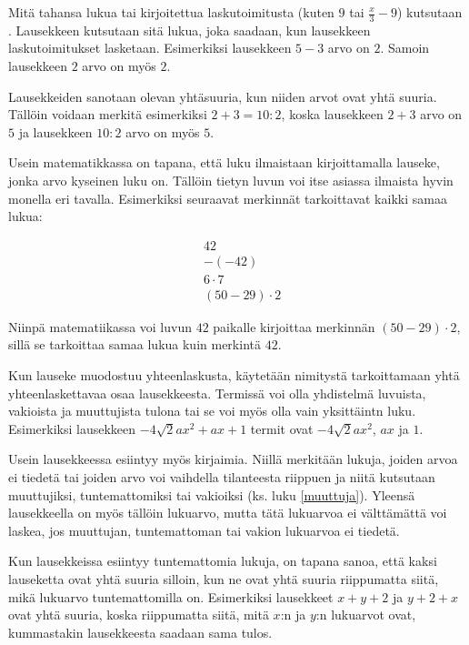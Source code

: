 Mitä tahansa lukua tai kirjoitettua laskutoimitusta (kuten $9$ tai $\frac{x}{3}-9$) kutsutaan . Lausekkeen  kutsutaan sitä lukua, joka saadaan, kun lausekkeen laskutoimitukset lasketaan. Esimerkiksi lausekkeen $5-3$ arvo on $2$. Samoin lausekkeen $2$ arvo on myös $2$.

Lausekkeiden sanotaan olevan yhtäsuuria, kun niiden arvot ovat yhtä suuria. Tällöin voidaan merkitä esimerkiksi $2+3=10:2$, koska lausekkeen $2+3$ arvo on $5$ ja lausekkeen $10:2$ arvo on myös $5$.

Usein matematikkassa on tapana, että luku ilmaistaan kirjoittamalla lauseke, jonka arvo kyseinen luku on. Tällöin tietyn luvun voi itse asiassa ilmaista hyvin monella eri tavalla. Esimerkiksi seuraavat merkinnät tarkoittavat kaikki samaa lukua:

\begin{align*}
                & 42 \\ & -(-42) \\ & 6 \cdot 7 \\ & (50-29) \cdot 2
\end{align*}

Niinpä matematiikassa voi luvun $42$ paikalle kirjoittaa merkinnän $(50-29)\cdot 2$, sillä se tarkoittaa samaa lukua kuin merkintä $42$.

Kun lauseke muodostuu yhteenlaskusta, käytetään nimitystä  tarkoittamaan yhtä yhteenlaskettavaa osaa lausekkeesta. Termissä voi olla yhdistelmä luvuista, vakioista ja muuttujista tulona tai se voi myös olla vain yksittäintn luku. Esimerkiksi lausekkeen $-4\sqrt{2}ax^2+ax+1$ termit ovat $-4\sqrt{2}ax^2$, $ax$ ja $1$.

Usein lausekkeessa esiintyy myös kirjaimia. Niillä merkitään lukuja, joiden arvoa ei tiedetä tai joiden arvo voi vaihdella tilanteesta riippuen ja niitä kutsutaan muuttujiksi, tuntemattomiksi tai vakioiksi (ks. luku \ref{muuttuja}). Yleensä lausekkeella on myös tällöin lukuarvo, mutta tätä lukuarvoa ei välttämättä voi laskea, jos muuttujan, tuntemattoman tai vakion lukuarvoa ei tiedetä.

Kun lausekkeissa esiintyy tuntemattomia lukuja, on tapana sanoa, että kaksi lauseketta ovat yhtä suuria silloin, kun ne ovat yhtä suuria riippumatta siitä, mikä lukuarvo tuntemattomilla on. Esimerkiksi lausekkeet $x+y+2$ ja $y+2+x$ ovat yhtä suuria, koska riippumatta siitä, mitä $x$:n ja $y$:n lukuarvot ovat, kummastakin lausekkeesta saadaan sama tulos.

